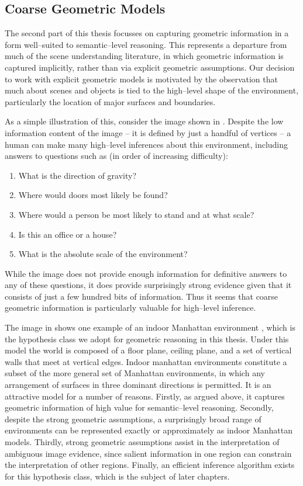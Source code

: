\subsection{Coarse Geometric Models}

The second part of this thesis focusses on capturing geometric
information in a form well--suited to semantic--level reasoning. This
represents a departure from much of the scene understanding
literature, in which geometric information is captured implicitly,
rather than via explicit geometric assumptions. Our decision to work
with explicit geometric models is motivated by the observation that
much about scenes and objects is tied to the high--level shape of the
environment, particularly the location of major surfaces and
boundaries.

As a simple illustration of this, consider the image shown in
. Despite the low information content of the
image -- it is defined by just a handful of vertices -- a human can
make many high--level inferences about this environment, including
answers to questions such as (in order of increasing difficulty):
\begin{enumerate}
  \item{What is the direction of gravity?}
  \item{Where would doors most likely be found?}
  \item{Where would a person be most likely to stand and at what scale?}
  \item{Is this an office or a house?}
  \item{What is the absolute scale of the environment?}
\end{enumerate}

While the image does not provide enough information for definitive
answers to any of these questions, it does provide surprisingly strong
evidence given that it consists of just a few hundred bits of
information. Thus it seems that coarse geometric information is
particularly valuable for high--level inference.

The image in  shows one example of an indoor
Manhattan environment \cite{Lee09}, which is the hypothesis class we
adopt for geometric reasoning in this thesis. Under this model the
world is composed of a floor plane, ceiling plane, and a set of
vertical walls that meet at vertical edges. Indoor manhattan
environments constitute a subset of the more general set of Manhattan
environments, in which any arrangement of surfaces in three dominant
directions is permitted. It is an attractive model for a number of
reasons. Firstly, as argued above, it captures geometric information
of high value for semantic--level reasoning. Secondly, despite the
strong geometric assumptions, a surprisingly broad range of
environments can be represented exactly or approximately as indoor
Manhattan models. Thirdly, strong geometric assumptions assist in the
interpretation of ambiguous image evidence, since salient information
in one region can constrain the interpretation of other
regions. Finally, an efficient inference algorithm exists for this
hypothesis class, which is the subject of later chapters.

